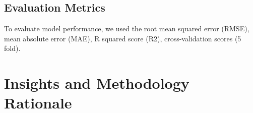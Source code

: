 \documentclass{article}
\begin{document}



\subsection{Evaluation Metrics}

To evaluate model performance, we used the root mean squared error (RMSE), mean absolute error (MAE), R squared score (R2), cross-validation scores (5 fold).

\section{Insights and Methodology Rationale}
\end{document}
